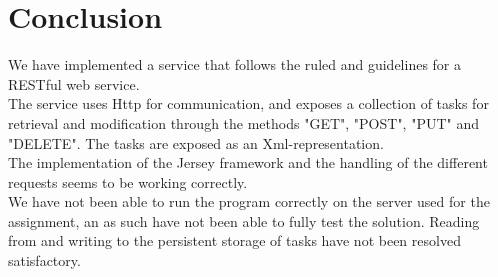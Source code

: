 \section{Conclusion}
\label{rest_conclusion}
We have implemented a service that follows the ruled and guidelines for a RESTful web service.\\
The service uses Http for communication, and exposes a collection of tasks for retrieval and modification through the methods "GET", "POST", "PUT" and "DELETE". The tasks are exposed as an Xml-representation.\\
The implementation of the Jersey framework and the handling of the different requests seems to be working correctly.\\
We have not been able to run the program correctly on the server used for the assignment, an as such have not been able to fully test the solution. Reading from and writing to the persistent storage of tasks have not been resolved satisfactory. 